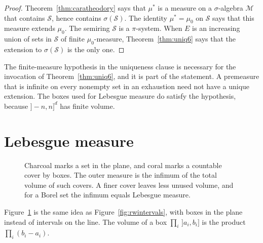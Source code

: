 \begin{proof}
Theorem~\ref{thm:caratheodory} says that $\mu^*$ is a measure on a $\sigma$-algebra $\mathcal M$ that contains $\mathcal S$, hence contains $\sigma(\mathcal S)$.
The identity $\mu^*=\mu_0$ on $\mathcal S$ says that this measure extends $\mu_0$.
The semiring $\mathcal S$ is a $\pi$-system.
When $E$ is an increasing union of sets in $\mathcal S$ of finite $\mu_0$-measure, Theorem~\ref{thm:uniq6} says that the extension to $\sigma(\mathcal S)$ is the only one.
\end{proof}

The finite-measure hypothesis in the uniqueness clause is necessary for the invocation of Theorem~\ref{thm:uniq6}, and it is part of the statement.
A premeasure that is infinite on every nonempty set in an exhaustion need not have a unique extension.
The boxes used for Lebesgue measure do satisfy the hypothesis, because $]-n,n]^d$ has finite volume.

\section{Lebesgue measure}

\begin{figure}[ht]
\centering
{}
\caption{Charcoal marks a set in the plane, and coral marks a countable cover by boxes.
The outer measure is the infimum of the total volume of such covers.
A finer cover leaves less unused volume, and for a Borel set the infimum equals Lebesgue measure.}
\label{fig:covering}
\end{figure}

Figure~\ref{fig:covering} is the same idea as Figure~\ref{fig:rwintervals}, with boxes in the plane instead of intervals on the line.
The volume of a box $\prod_i\,]a_i,b_i]$ is the product $\prod_i(b_i-a_i)$.

